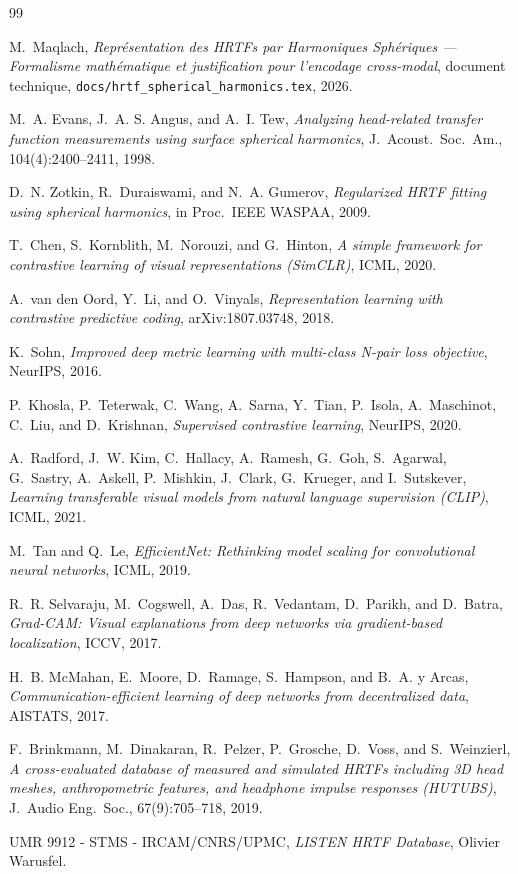 \documentclass[12pt, a4paper]{article}
\begin{document}
\begin{thebibliography}{99}

M.~Maqlach,
\textit{Représentation des HRTFs par Harmoniques Sphériques — Formalisme
mathématique et justification pour l'encodage cross-modal},
document technique, \texttt{docs/hrtf\_spherical\_harmonics.tex}, 2026.

M.~A. Evans, J.~A. S. Angus, and A.~I. Tew,
\textit{Analyzing head-related transfer function measurements using
surface spherical harmonics},
J.\ Acoust.\ Soc.\ Am., 104(4):2400--2411, 1998.

D.~N. Zotkin, R.~Duraiswami, and N.~A. Gumerov,
\textit{Regularized HRTF fitting using spherical harmonics},
in Proc.\ IEEE WASPAA, 2009.

T.~Chen, S.~Kornblith, M.~Norouzi, and G.~Hinton,
\textit{A simple framework for contrastive learning of visual
representations (SimCLR)},
ICML, 2020.

A.~van den Oord, Y.~Li, and O.~Vinyals,
\textit{Representation learning with contrastive predictive coding},
arXiv:1807.03748, 2018.

K.~Sohn,
\textit{Improved deep metric learning with multi-class N-pair loss
objective},
NeurIPS, 2016.

P.~Khosla, P.~Teterwak, C.~Wang, A.~Sarna, Y.~Tian, P.~Isola, A.~Maschinot,
C.~Liu, and D.~Krishnan,
\textit{Supervised contrastive learning},
NeurIPS, 2020.

A.~Radford, J.~W. Kim, C.~Hallacy, A.~Ramesh, G.~Goh, S.~Agarwal,
G.~Sastry, A.~Askell, P.~Mishkin, J.~Clark, G.~Krueger, and I.~Sutskever,
\textit{Learning transferable visual models from natural language
supervision (CLIP)},
ICML, 2021.

M.~Tan and Q.~Le,
\textit{EfficientNet: Rethinking model scaling for convolutional neural
networks},
ICML, 2019.

R.~R. Selvaraju, M.~Cogswell, A.~Das, R.~Vedantam, D.~Parikh, and D.~Batra,
\textit{Grad-CAM: Visual explanations from deep networks via
gradient-based localization},
ICCV, 2017.

H.~B. McMahan, E.~Moore, D.~Ramage, S.~Hampson, and B.~A. y Arcas,
\textit{Communication-efficient learning of deep networks from
decentralized data},
AISTATS, 2017.

F.~Brinkmann, M.~Dinakaran, R.~Pelzer, P.~Grosche, D.~Voss, and S.~Weinzierl,
\textit{A cross-evaluated database of measured and simulated HRTFs
including 3D head meshes, anthropometric features, and headphone
impulse responses (HUTUBS)},
J.\ Audio Eng.\ Soc., 67(9):705--718, 2019.

UMR 9912 - STMS - IRCAM/CNRS/UPMC,
\textit{LISTEN HRTF Database},
Olivier Warusfel.

\end{thebibliography}
\end{document}
